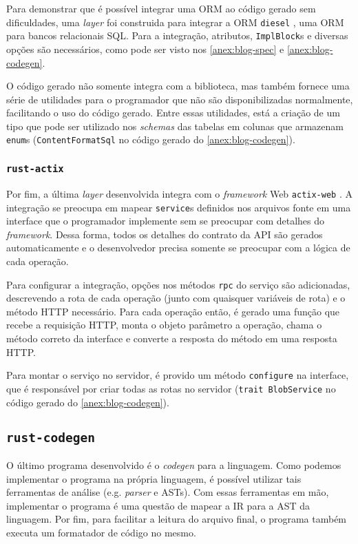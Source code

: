 Para demonstrar que é possível integrar uma ORM ao código gerado sem dificuldades, uma
\textit{layer} foi construida para integrar a ORM \texttt{diesel} \cite{rust:diesel},
uma ORM para bancos relacionais SQL. Para a integração, atributos, \texttt{ImplBlock}s
e diversas opções são necessários, como pode ser visto nos \cref{anex:blog-spec} e
\cref{anex:blog-codegen}.

O código gerado não somente integra com a biblioteca, mas também fornece uma série de
utilidades para o programador que não são disponibilizadas normalmente, facilitando o
uso do código gerado. Entre essas utilidades, está a criação de um tipo que pode ser
utilizado nos \textit{schemas} das tabelas em colunas que armazenam \texttt{enum}s
(\texttt{ContentFormatSql} no código gerado do \cref{anex:blog-codegen}).

\subsubsection{\texttt{rust-actix}}

Por fim, a última \textit{layer} desenvolvida integra com o \textit{framework} Web
\texttt{actix-web} \cite{rust:actix-web}. A integração se preocupa em mapear
\texttt{service}s definidos nos arquivos fonte em uma interface que o programador
implemente sem se preocupar com detalhes do \textit{framework}. Dessa forma, todos
os detalhes do contrato da API são gerados automaticamente e o desenvolvedor precisa
somente se preocupar com a lógica de cada operação.

Para configurar a integração, opções nos métodos \texttt{rpc} do serviço são adicionadas,
descrevendo a rota de cada operação (junto com quaisquer variáveis de rota) e o método
HTTP necessário. Para cada operação então, é gerado uma função que recebe a requisição
HTTP, monta o objeto parâmetro a operação, chama o método correto da interface e converte
a resposta do método em uma resposta HTTP.

Para montar o serviço no servidor, é provido um método \texttt{configure} na interface,
que é responsável por criar todas as rotas no servidor (\texttt{trait BlobService} no
código gerado do \cref{anex:blog-codegen}).

\subsection{\texttt{rust-codegen}}

O último programa desenvolvido é o \textit{codegen} para a linguagem. Como podemos
implementar o programa na própria linguagem, é possível utilizar tais ferramentas de
análise (e.g. \textit{parser} e ASTs). Com essas ferramentas em mão, implementar o programa
é uma questão de mapear a IR para a AST da linguagem. Por fim, para facilitar a leitura
do arquivo final, o programa também executa um formatador de código no mesmo.
